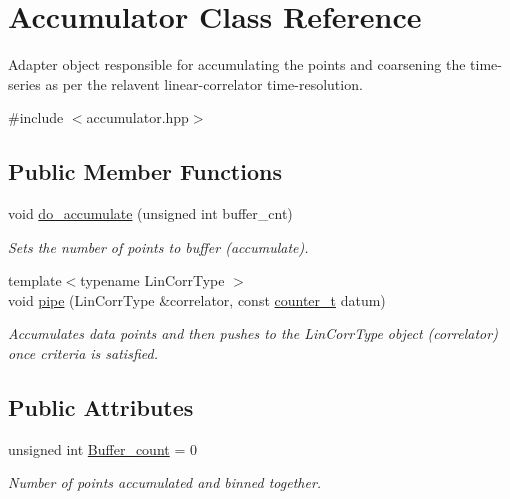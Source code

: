 \hypertarget{classAccumulator}{}\section{Accumulator Class Reference}
\label{classAccumulator}


Adapter object responsible for accumulating the points and coarsening the time-\/series as per the relavent linear-\/correlator time-\/resolution.  




{\ttfamily \#include $<$accumulator.\+hpp$>$}

\subsection*{Public Member Functions}
\begin{DoxyCompactItemize}
\item 
void \hyperlink{classAccumulator_adab342ee6d376a45ed38fe1e1679a1e2}{do\+\_\+accumulate} (unsigned int buffer\+\_\+cnt)
\begin{DoxyCompactList}\small\item\em Sets the number of points to buffer (accumulate). \end{DoxyCompactList}\item 
{\footnotesize template$<$typename Lin\+Corr\+Type $>$ }\\void \hyperlink{classAccumulator_a0b77af4be52d4c8f627cefb1f5315c98}{pipe} (Lin\+Corr\+Type \&correlator, const \hyperlink{types_8hpp_a22f279793847eba127de149437848c48}{counter\+\_\+t} datum)
\begin{DoxyCompactList}\small\item\em Accumulates data points and then pushes to the {\ttfamily Lin\+Corr\+Type} object (correlator) once criteria is satisfied. \end{DoxyCompactList}\end{DoxyCompactItemize}
\subsection*{Public Attributes}
\begin{DoxyCompactItemize}
\item 
unsigned int \hyperlink{classAccumulator_a6e4595169413a77122fe56cdd39137ae}{Buffer\+\_\+count} = 0
\begin{DoxyCompactList}\small\item\em Number of points accumulated and binned together. \end{DoxyCompactList}\end{DoxyCompactItemize}
